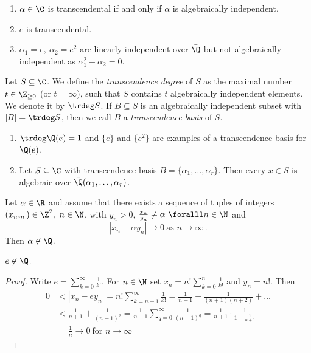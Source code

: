 \begin{exmp*}
	\begin{enumerate}
		\item \( \alpha \in \C \) is transcendental if and only if \( \alpha \) is algebraically independent.
		\item \( e \) is transcendental.
		\item \( \alpha_1 = e,\ \alpha_2 = e^2 \) are linearly independent over \( \bar{\Q} \) but not algebraically independent as \( \alpha_1^2 - \alpha_2 = 0 \).
	\end{enumerate}
\end{exmp*}

\begin{defn*}
	Let \( S \subseteq \C \).
	We define the \emph{transcendence degree} of \( S \) as the maximal number \( t \in \Z_{\geq 0} \) (or \( t = \infty \)), such that \( S \) contains \( t \) algebraically independent elements.
	We denote it by \( \trdeg S \).
	If \( B \subseteq S \) is an algebraically independent subset with \( |B| = \trdeg S \), then we call \( B \) a \emph{transcendence basis} of \( S \).
\end{defn*}

\begin{exmp*}
	\begin{enumerate}
		\item \( \trdeg \Q(e) = 1 \) and \( \{e\} \) and \( \{e^2\} \) are examples of a transcendence basis for \( \Q(e) \).
		\item Let \( S \subseteq \C \) with transcendence basis \( B = \{\alpha_1, \dotsc, \alpha_r\} \).
			Then every \( x \in S \) is algebraic over \( \bar{\Q}(\alpha_1, \dots, \alpha_r) \).
	\end{enumerate}
\end{exmp*}

\begin{lem}
	Let \( \alpha \in \R \) and assume that there exists a sequence of tuples of integers \( (x_n, _n) \in \Z^2,\ n \in \N \), with \( y_n>0 \), \( \frac{x_n}{y_n} \neq \alpha \ \foralll n \in \N \) and
	\[ |x_n - \alpha y_n| \to 0\ \text{as } n \to \infty \,. \]
	Then \( \alpha \not\in \Q \).
\end{lem}

\begin{thmn}
	\( e \not\in \Q \).
\end{thmn}

\begin{proof}
	Write \( e = \sum_{k=0}^{\infty} \frac{1}{k!} \).
	For \( n \in \N \) set \( x_n = n! \sum_{k=0}^{n} \frac{1}{k!} \) and \( y_n = n! \).
	Then
	\begin{align*}
		0 &< \left| x_n - e y_n \right| = n! \sum_{k=n+1}^{\infty} \frac{1}{k!} = \frac{1}{n+1} + \frac{1}{(n+1)(n+2)} + \dots\\
		&< \frac{1}{n+1} + \frac{1}{(n+1)^2} = \frac{1}{n+1} \sum_{q=0}^{\infty} \frac{1}{(n+1)^q} = \frac{1}{n+1} \cdot \frac{1}{1 - \frac{1}{n+1}}\\
		&= \frac{1}{n} \to 0 \ \text{for } n \to \infty
	\end{align*}
\end{proof}


